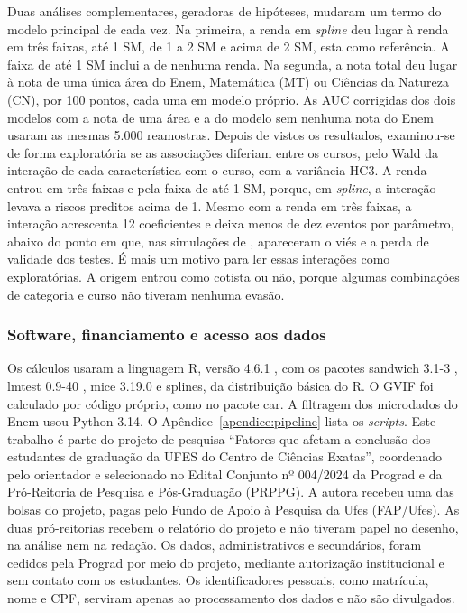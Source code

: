 \documentclass[12pt,a4paper]{article}
\begin{document}
Duas análises complementares, geradoras de hipóteses, mudaram um termo do modelo principal de cada vez. Na primeira, a renda em \textit{spline} deu lugar à renda em três faixas, até 1 SM, de 1 a 2 SM e acima de 2 SM, esta como referência. A faixa de até 1 SM inclui a de nenhuma renda. Na segunda, a nota total deu lugar à nota de uma única área do Enem, Matemática (MT) ou Ciências da Natureza (CN), por 100 pontos, cada uma em modelo próprio. As AUC corrigidas dos dois modelos com a nota de uma área e a do modelo sem nenhuma nota do Enem usaram as mesmas 5.000 reamostras. Depois de vistos os resultados, examinou-se de forma exploratória se as associações diferiam entre os cursos, pelo Wald da interação de cada característica com o curso, com a variância HC3. A renda entrou em três faixas e pela faixa de até 1 SM, porque, em \textit{spline}, a interação levava a riscos preditos acima de 1. Mesmo com a renda em três faixas, a interação acrescenta 12 coeficientes e deixa menos de dez eventos por parâmetro, abaixo do ponto em que, nas simulações de \citet{peduzzi1996simulation}, apareceram o viés e a perda de validade dos testes. É mais um motivo para ler essas interações como exploratórias. A origem entrou como cotista ou não, porque algumas combinações de categoria e curso não tiveram nenhuma evasão.

\subsubsection{Software, financiamento e acesso aos dados}
\label{sec:software}

Os cálculos usaram a linguagem R, versão 4.6.1 \citep{rcore2026}, com os pacotes sandwich 3.1-3 \citep{zeileis2006object}, lmtest 0.9-40 \citep{zeileis2002lmtest}, mice 3.19.0 \citep{vanbuuren2011mice} e splines, da distribuição básica do R. O GVIF foi calculado por código próprio, como no pacote car. A filtragem dos microdados do Enem usou Python 3.14. O Apêndice~\ref{apendice:pipeline} lista os \textit{scripts}. Este trabalho é parte do projeto de pesquisa ``Fatores que afetam a conclusão dos estudantes de graduação da UFES do Centro de Ciências Exatas'', coordenado pelo orientador e selecionado no Edital Conjunto nº 004/2024 da Prograd e da Pró-Reitoria de Pesquisa e Pós-Graduação (PRPPG). A autora recebeu uma das bolsas do projeto, pagas pelo Fundo de Apoio à Pesquisa da Ufes (FAP/Ufes). As duas pró-reitorias recebem o relatório do projeto e não tiveram papel no desenho, na análise nem na redação. Os dados, administrativos e secundários, foram cedidos pela Prograd por meio do projeto, mediante autorização institucional e sem contato com os estudantes. Os identificadores pessoais, como matrícula, nome e CPF, serviram apenas ao processamento dos dados e não são divulgados.
\end{document}
